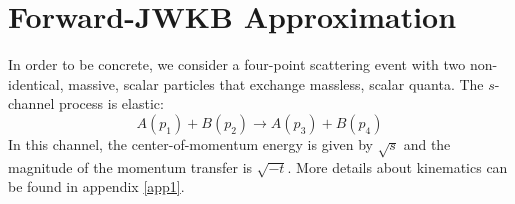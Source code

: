 \section{Forward-JWKB Approximation\label{sec2}}
In order to be concrete, we consider a four-point scattering event with two non-identical, massive, scalar particles that exchange massless, scalar quanta. The $s$-channel process is elastic:
\begin{equation}
	A(p_{1}) + B(p_{2}) \longrightarrow A(p_{3}) + B(p_{4}) \label{ScaProc}
\end{equation}
In this channel, the center-of-momentum energy is given by $\sqrt{s}$ and the magnitude of the momentum transfer is $\sqrt{-t}$. More details about kinematics can be found in appendix \ref{app1}.
